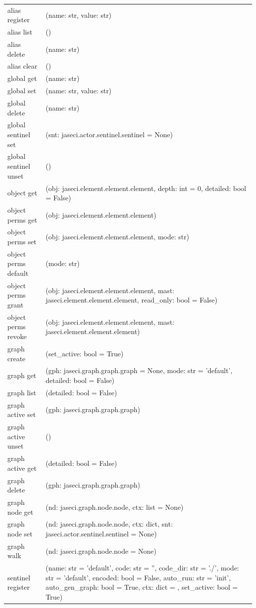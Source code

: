 {\begin{longtable}{l p{10cm}}
        alias register & (name: str, value: str) \\
        alias list & () \\
        alias delete & (name: str) \\
        alias clear & () \\
        global get & (name: str) \\
        global set & (name: str, value: str) \\
        global delete & (name: str) \\
        global sentinel set & (snt: jaseci.actor.sentinel.sentinel = None) \\
        global sentinel unset & () \\
        object get & (obj: jaseci.element.element.element, depth: int = 0, detailed: bool = False) \\
        object perms get & (obj: jaseci.element.element.element) \\
        object perms set & (obj: jaseci.element.element.element, mode: str) \\
        object perms default & (mode: str) \\
        object perms grant & (obj: jaseci.element.element.element, mast: jaseci.element.element.element, read\_only: bool = False) \\
        object perms revoke & (obj: jaseci.element.element.element, mast: jaseci.element.element.element) \\
        graph create & (set\_active: bool = True) \\
        graph get & (gph: jaseci.graph.graph.graph = None, mode: str = 'default', detailed: bool = False) \\
        graph list & (detailed: bool = False) \\
        graph active set & (gph: jaseci.graph.graph.graph) \\
        graph active unset & () \\
        graph active get & (detailed: bool = False) \\
        graph delete & (gph: jaseci.graph.graph.graph) \\
        graph node get & (nd: jaseci.graph.node.node, ctx: list = None) \\
        graph node set & (nd: jaseci.graph.node.node, ctx: dict, snt: jaseci.actor.sentinel.sentinel = None) \\
        graph walk & (nd: jaseci.graph.node.node = None) \\
        sentinel register & (name: str = 'default', code: str = '', code\_dir: str = './', mode: str = 'default', encoded: bool = False, auto\_run: str = 'init', auto\_gen\_graph: bool = True, ctx: dict = {}, set\_active: bool = True) \\

\end{longtable}}
